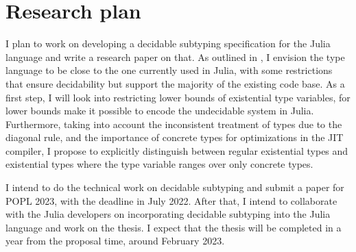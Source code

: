 \chapter{Research plan}\label{chap:6}

I plan to work on developing a decidable subtyping specification for the Julia
language and write a research paper on that.
As outlined in , I envision the type language to be close to the
one currently used in Julia, with some restrictions that ensure decidability
but support the majority of the existing code base.
As a first step, I will look into restricting lower bounds of existential type
variables, for lower bounds make it possible to encode the undecidable
system \FSub in Julia. Furthermore, taking into account the inconsistent
treatment of types due to the diagonal rule,
and the importance of concrete types for optimizations in the JIT compiler,
I propose to explicitly distinguish between regular existential types
and existential types where the type variable ranges over only concrete types.

I intend to do the technical work on decidable subtyping and submit a paper
for POPL 2023, with the deadline in July 2022.
After that, I intend to collaborate with the Julia developers on incorporating
decidable subtyping into the Julia language and work on the thesis.
I expect that the thesis will be completed in a year from the proposal time,
around February 2023.
